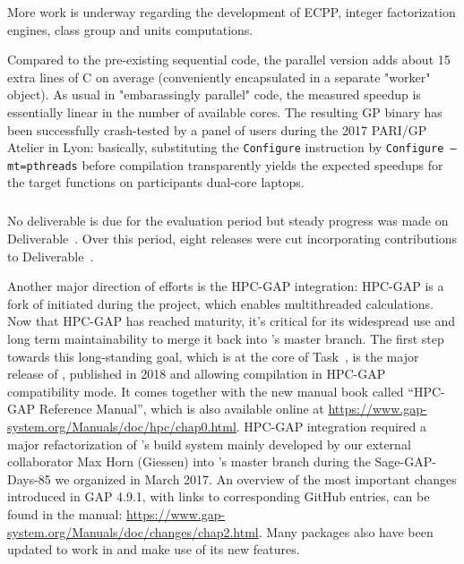 More work is underway regarding the development of  ECPP, integer
factorization engines, class group and units computations.

Compared to the pre-existing sequential code, the parallel version adds about 15 extra lines of
C on average (conveniently encapsulated in a separate "worker" object). As usual
in "embarassingly parallel" code, the measured speedup is essentially linear in
the number of available cores. The resulting GP binary has been successfully
crash-tested by a panel of users during the 2017 PARI/GP Atelier in Lyon:
basically, substituting the \texttt{Configure} instruction by \texttt{Configure --mt=pthreads}
before compilation transparently yields the expected speedups for the target
functions on participants dual-core laptops. 


\subparagraph{}

No deliverable is due for the evaluation period but steady progress was made on
Deliverable~. Over this period, eight releases were cut
incorporating contributions to Deliverable~.

Another major direction of efforts is the HPC-GAP integration:
HPC-GAP is a fork of \GAP initiated during the \scienceproject project, which
enables multithreaded calculations. Now that HPC-GAP has reached
maturity, it's critical for its widespread use and long term
maintainability to merge it back into \GAP's master branch.
The first step towards this long-standing goal, which is at the core of
Task~, is the major release of , published in 2018 and allowing compilation in HPC-GAP
compatibility mode. It comes together with the new manual book called ``HPC-GAP Reference Manual'',
which is also available online at \url{https://www.gap-system.org/Manuals/doc/hpc/chap0.html}.
HPC-GAP integration required a major
refactorization of \GAP's build system
mainly developed by our external collaborator Max Horn (Giessen) into \GAP's master
branch during the Sage-GAP-Days-85 we organized in March 2017. 
An overview of the most important changes introduced in GAP 4.9.1,
with links to corresponding GitHub entries,
can be found in the \GAP manual: \url{https://www.gap-system.org/Manuals/doc/changes/chap2.html}.
Many \GAP packages also have been updated to work in  and make use of its new features.

\subparagraph{}

